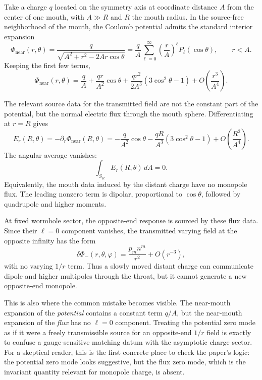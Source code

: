 \documentclass[aps,prd,onecolumn,nofootinbib,superscriptaddress]{revtex4-2}
\begin{document}
Take a charge $q$ located on the symmetry axis at coordinate distance $A$ from the center of one mouth, with $A \gg R$ and $R$ the mouth radius. In the source-free neighborhood of the mouth, the Coulomb potential admits the standard interior expansion
\begin{equation}
\Phi_{\mathrm{near}}(r,\theta)
= \frac{q}{\sqrt{A^2+r^2-2Ar\cos\theta}}
= \frac{q}{A}\sum_{\ell=0}^{\infty}
\left(\frac{r}{A}\right)^\ell P_\ell(\cos\theta),
\qquad r<A.
\end{equation}
Keeping the first few terms,
\begin{equation}
\Phi_{\mathrm{near}}(r,\theta)
= \frac{q}{A}
+ \frac{q r}{A^2}\cos\theta
+ \frac{q r^2}{2A^3}\left(3\cos^2\theta-1\right)
+ O\!\left(\frac{r^3}{A^4}\right).
\end{equation}

The relevant source data for the transmitted field are not the constant part of the potential, but the normal electric flux through the mouth sphere. Differentiating at $r=R$ gives
\begin{equation}
E_r(R,\theta)
= -\partial_r \Phi_{\mathrm{near}}(R,\theta)
= -\frac{q}{A^2}\cos\theta
- \frac{qR}{A^3}\left(3\cos^2\theta-1\right)
+ O\!\left(\frac{R^2}{A^4}\right).
\end{equation}
The angular average vanishes:
\begin{equation}
\int_{S_R} E_r(R,\theta)\, dA = 0.
\end{equation}
Equivalently, the mouth data induced by the distant charge have no monopole flux. The leading nonzero term is dipolar, proportional to $\cos\theta$, followed by quadrupole and higher moments.

At fixed wormhole sector, the opposite-end response is sourced by these flux data. Since their $\ell=0$ component vanishes, the transmitted varying field at the opposite infinity has the form
\begin{equation}
\delta \Phi_{-}(r,\theta,\varphi)
= \frac{p_m n^m}{r^2}
+ O(r^{-3}),
\end{equation}
with no varying $1/r$ term. Thus a slowly moved distant charge can communicate dipole and higher multipoles through the throat, but it cannot generate a new opposite-end monopole.

This is also where the common mistake becomes visible. The near-mouth expansion of the \emph{potential} contains a constant term $q/A$, but the near-mouth expansion of the \emph{flux} has no $\ell=0$ component. Treating the potential zero mode as if it were a freely transmissible source for an opposite-end $1/r$ field is exactly to confuse a gauge-sensitive matching datum with the asymptotic charge sector. For a skeptical reader, this is the first concrete place to check the paper's logic: the potential zero mode looks suggestive, but the flux zero mode, which is the invariant quantity relevant for monopole charge, is absent.
\end{document}
